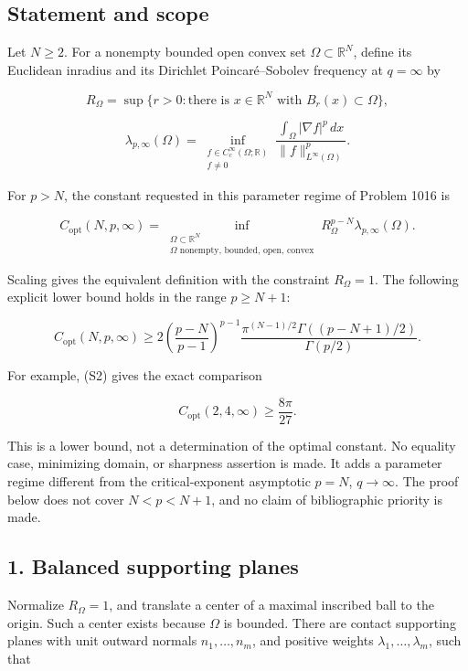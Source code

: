 \documentclass[11pt,a4paper]{article}
\begin{document}
\hypertarget{1016-statement-and-scope}{%
\subsection{Statement and scope}\label{1016-statement-and-scope}}

Let \(N\geq2\). For a nonempty bounded open convex set
\(\Omega\subset\mathbb R^N\), define its Euclidean inradius and its
Dirichlet Poincaré--Sobolev frequency at \(q=\infty\) by

\[
R_\Omega=\sup\{r>0:\text{there is }x\in\mathbb R^N
\text{ with }B_r(x)\subset\Omega\},
\]

\[
\lambda_{p,\infty}(\Omega)
=\inf_{\substack{f\in C_c^\infty(\Omega;\mathbb R)\\f\ne0}}
\frac{\displaystyle\int_\Omega|\nabla f|^p\,dx}
     {\|f\|_{L^\infty(\Omega)}^p}.
\]

For \(p>N\), the constant requested in this parameter regime of Problem
1016 is

\[
C_{\mathrm{opt}}(N,p,\infty)
=\inf_{\substack{\Omega\subset\mathbb R^N\\
\Omega\text{ nonempty, bounded, open, convex}}}
R_\Omega^{p-N}\lambda_{p,\infty}(\Omega).
\tag{S1}
\]

Scaling gives the equivalent definition with the constraint
\(R_\Omega=1\). The following explicit lower bound holds in the range
\(p\geq N+1\):

\[
\boxed{
C_{\mathrm{opt}}(N,p,\infty)
\geq
2\left(\frac{p-N}{p-1}\right)^{p-1}
\frac{\pi^{(N-1)/2}\Gamma((p-N+1)/2)}{\Gamma(p/2)}.
}
\tag{S2}
\]

For example, (S2) gives the exact comparison

\[
C_{\mathrm{opt}}(2,4,\infty)\geq\frac{8\pi}{27}.
\]

This is a lower bound, not a determination of the optimal constant. No
equality case, minimizing domain, or sharpness assertion is made. It
adds a parameter regime different from the critical-exponent asymptotic
\(p=N\), \(q\to\infty\). The proof below does not cover \(N<p<N+1\), and
no claim of bibliographic priority is made.

\hypertarget{1016-balanced-supporting-planes}{%
\subsection{1. Balanced supporting
planes}\label{1016-balanced-supporting-planes}}

Normalize \(R_\Omega=1\), and translate a center of a maximal inscribed
ball to the origin. Such a center exists because \(\Omega\) is bounded.
There are contact supporting planes with unit outward normals
\(n_1,\ldots,n_m\), and positive weights \(\lambda_1,\ldots,\lambda_m\),
such that
\end{document}
